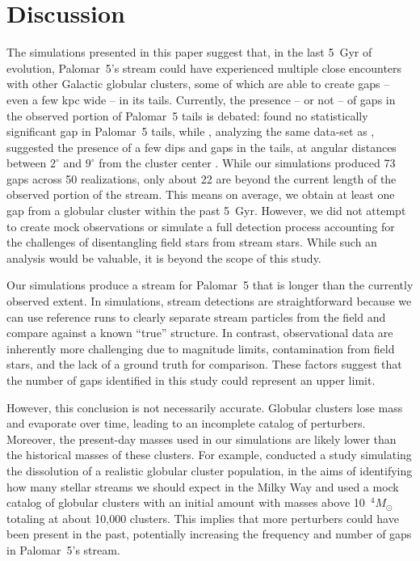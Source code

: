\documentclass[draft]{aa}
\begin{document}
  
  
\section{Discussion}
  
  The simulations presented in this paper suggest that, in the last 5~Gyr of evolution, Palomar~5's stream could have experienced multiple close encounters with other Galactic globular clusters, some of which are able to create gaps -- even a few kpc wide -- in its tails. Currently, the presence -- or not -- of gaps in the observed portion of Palomar~5 tails is debated: \citet{2016ApJ...819....1I} found no statistically significant gap in Palomar~5 tails, while \citet{2017MNRAS.470...60E}, analyzing the same data-set as \citet{2016ApJ...819....1I}, suggested the presence of a few dips and gaps in the tails, at angular distances between $2^\circ$ and $9^\circ$ from the cluster center \citep[see also][]{ 2020ApJ...889...70B}. While our simulations produced 73 gaps across 50 realizations, only about 22 are beyond the current length of the observed portion of the stream. This means on average, we obtain at least one gap from a globular cluster within the past 5~Gyr. However, we did not attempt to create mock observations or simulate a full detection process accounting for the challenges of disentangling field stars from stream stars. While such an analysis would be valuable, it is beyond the scope of this study.

  
  Our simulations produce a stream for Palomar~5 that is longer than the currently observed extent. In simulations, stream detections are straightforward because we can use reference runs to clearly separate stream particles from the field and compare against a known ``true'' structure. In contrast, observational data are inherently more challenging due to magnitude limits, contamination from field stars, and the lack of a ground truth for comparison. These factors suggest that the number of gaps identified in this study could represent an upper limit.

  However, this conclusion is not necessarily accurate. Globular clusters lose mass and evaporate over time, leading to an incomplete catalog of perturbers. Moreover, the present-day masses used in our simulations are likely lower than the historical masses of these clusters. For example, \citet{2024ApJ...976...54P} conducted a study simulating the dissolution of a realistic globular cluster population, in the aims of identifying how many stellar streams we should expect in the Milky Way and used a mock catalog of globular clusters with an initial amount with masses above 10~$^4 M_\odot$ totaling at about 10,000 clusters. This implies that more perturbers could have been present in the past, potentially increasing the frequency and number of gaps in Palomar~5's stream.
  
\end{document}

